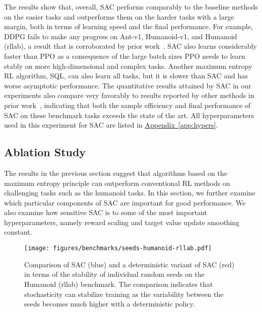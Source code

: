 \documentclass{article}
\newcommand{\aref}[1]{\hyperref[#1]{Appendix~\ref*{#1}}}
\begin{document}
The results show that, overall, SAC performs comparably to the baseline methods on the easier tasks and outperforms them on the  harder tasks with a large margin, both in terms of learning speed and the final performance. For example, DDPG fails to make any progress on Ant-v1, Humanoid-v1, and Humanoid (rllab), a result that is corroborated by prior work~\citep{gu2016q,duan2016benchmarking}. SAC also learns considerably faster than PPO as a consequence of the large batch sizes PPO needs to learn stably on more high-dimensional and complex tasks. 
Another maximum entropy RL algorithm, SQL, can also learn all tasks, but it is slower than SAC and has worse asymptotic performance. 
The quantitative results attained by SAC in our experiments also compare very favorably to results reported by other methods in prior work~\citep{duan2016benchmarking,gu2016q,henderson2017deep}, indicating that both the sample efficiency and final performance of SAC on these benchmark tasks exceeds the state of the art. All hyperparameters used in this experiment for SAC are listed in \aref{app:hypers}. 




\subsection{Ablation Study}
\label{sec:ablations}

The results in the previous section suggest that algorithms based on the maximum entropy principle can outperform conventional RL methods on challenging tasks such as the humanoid tasks. In this section, we further examine which particular components of SAC are important for good performance. We also examine how sensitive SAC is to some of the most important hyperparameters, namely reward scaling and target value update smoothing constant.
\begin{figure}
\begin{centering}
    \texttt{[image: figures/benchmarks/seeds-humanoid-rllab.pdf]}
    \caption{\small Comparison of SAC (blue) and a deterministic variant of SAC (red) in terms of the stability of individual random seeds on the Humanoid (rllab) benchmark. The comparison indicates that stochasticity can  stabilize training as the variability between the seeds becomes much higher with a deterministic policy.}
\label{fig:humanoid_seeds}
\end{centering}
\end{figure}
\end{document}
